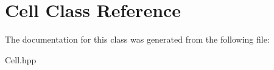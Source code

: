 \hypertarget{classCell}{}\section{Cell Class Reference}
\label{classCell}


The documentation for this class was generated from the following file\+:\begin{DoxyCompactItemize}
\item 
Cell.\+hpp\end{DoxyCompactItemize}
